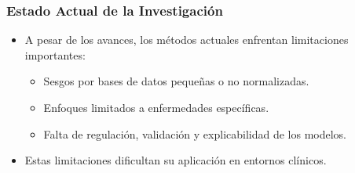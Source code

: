 \begin{frame}
\frametitle{Estado Actual de la Investigación}
\begin{itemize}
    \item A pesar de los avances, los métodos actuales enfrentan limitaciones importantes:
    \begin{itemize}
        \item Sesgos por bases de datos pequeñas o no normalizadas.
        \item Enfoques limitados a enfermedades específicas.
        \item Falta de regulación, validación y explicabilidad de los modelos.
    \end{itemize}
    \item Estas limitaciones dificultan su aplicación en entornos clínicos.
\end{itemize}
\end{frame}
